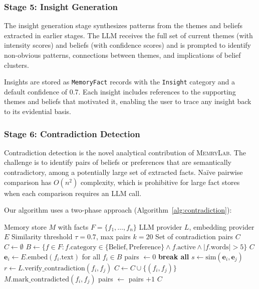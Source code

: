 \documentclass[manuscript,review]{acmart}
\begin{document}
\subsubsection{Stage 5: Insight Generation}
The insight generation stage synthesizes patterns from the themes and beliefs extracted in earlier stages.
The LLM receives the full set of current themes (with intensity scores) and beliefs (with confidence scores) and is prompted to identify non-obvious patterns, connections between themes, and implications of belief clusters.

Insights are stored as \texttt{MemoryFact} records with the \texttt{Insight} category and a default confidence of 0.7.
Each insight includes references to the supporting themes and beliefs that motivated it, enabling the user to trace any insight back to its evidential basis.

\subsubsection{Stage 6: Contradiction Detection}
\label{sec:contradiction}

Contradiction detection is the novel analytical contribution of \textsc{MemryLab}.
The challenge is to identify pairs of beliefs or preferences that are semantically contradictory, among a potentially large set of extracted facts.
Na\"ive pairwise comparison has $O(n^2)$ complexity, which is prohibitive for large fact stores when each comparison requires an LLM call.

Our algorithm uses a two-phase approach (Algorithm~\ref{alg:contradiction}):

\begin{algorithm}[t]
\caption{Contradiction Detection}
\label{alg:contradiction}
\begin{algorithmic}[1]
\REQUIRE Memory store $M$ with facts $F = \{f_1, \ldots, f_n\}$
\REQUIRE LLM provider $L$, embedding provider $E$
\REQUIRE Similarity threshold $\tau = 0.7$, max pairs $k = 20$
\ENSURE Set of contradiction pairs $C$
\STATE $C \leftarrow \emptyset$
\STATE $B \leftarrow \{f \in F : f.\text{category} \in \{\text{Belief}, \text{Preference}\} \wedge f.\text{active} \wedge |f.\text{words}| > 5\}$
    \RETURN $C$
\ENDIF
\STATE $\mathbf{e}_i \leftarrow E.\text{embed}(f_i.\text{text})$ for all $f_i \in B$ 
\STATE pairs $\leftarrow 0$
            \STATE \textbf{break all}
        \ENDIF
        \STATE $s \leftarrow \text{sim}(\mathbf{e}_i, \mathbf{e}_j)$ 
         
            \STATE $r \leftarrow L.\text{verify\_contradiction}(f_i, f_j)$
                \STATE $C \leftarrow C \cup \{(f_i, f_j)\}$
                \STATE $M.\text{mark\_contradicted}(f_i, f_j)$
            \ENDIF
            \STATE pairs $\leftarrow$ pairs $+ 1$
        \ENDIF
    \ENDFOR
\ENDFOR
\RETURN $C$
\end{algorithmic}
\end{algorithm}
\end{document}
